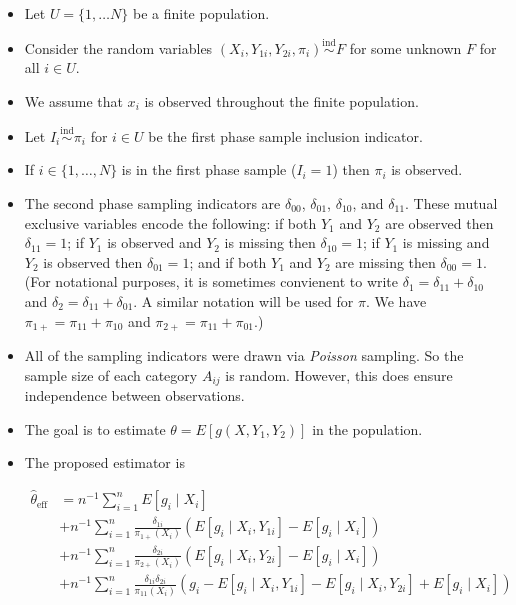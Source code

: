 \documentclass[12pt]{article}
\begin{document}
\begin{itemize}
  \item Let $U = \{1, \dots N\}$ be a finite population.
  \item Consider the random variables $(X_i, Y_{1i}, Y_{2i}, \pi_i) 
    \stackrel{\text{ind}}{\sim} F$ for some unknown $F$ for all $i \in U$.
  \item We assume that $x_i$ is observed throughout the finite population.
  \item Let $I_i \stackrel{\text{ind}}{\sim} \pi_i$ for $i \in U$ be the 
    first phase sample inclusion indicator.
  \item If $i \in \{1, \dots, N\}$ is in the first phase sample ($I_i = 1$)
    then $\pi_i$ is observed. 
  \item The second phase sampling indicators are $\delta_{00}$, $\delta_{01}$,
    $\delta_{10}$, and $\delta_{11}$. These mutual exclusive variables encode 
    the following: if both $Y_1$ and $Y_2$ are observed then $\delta_{11} = 1$;
    if $Y_1$ is observed and $Y_2$ is missing then $\delta_{10} = 1$; if $Y_1$
    is missing and $Y_2$ is observed then $\delta_{01} = 1$; and if both $Y_1$
    and $Y_2$ are missing then $\delta_{00} = 1$. (For notational purposes, it
    is sometimes convienent to write $\delta_{1} = \delta_{11} + \delta_{10}$ 
    and $\delta_2 = \delta_{11} + \delta_{01}$. A similar notation will be 
    used for $\pi$. We have $\pi_{1+} = \pi_{11} + \pi_{10}$ and 
    $\pi_{2+} = \pi_{11} + \pi_{01}$.)
  \item All of the sampling indicators were drawn via \textit{Poisson}
    sampling. So the sample size of each category $A_{ij}$ is random. However,
    this does ensure independence between observations.
  \item The goal is to estimate $\theta = E[g(X, Y_1, Y_2)]$ in the population.
  \item The proposed estimator is

  \begin{align}\label{eq:prop}
    \hat \theta_{\text{eff}} 
    &= n^{-1} \sum_{i = 1}^n E[g_i \mid X_i] \nonumber \\ 
    &+ n^{-1} \sum_{i = 1}^n \frac{\delta_{1i}}{\pi_{1+}(X_i)}
      (E[g_i \mid X_i, Y_{1i}] - E[g_i \mid X_i])\nonumber  \\ 
    &+ n^{-1} \sum_{i = 1}^n \frac{\delta_{2i}}{\pi_{2+}(X_i)}
      (E[g_i \mid X_i, Y_{2i}] - E[g_i \mid X_i])\nonumber  \\ 
    &+ n^{-1} \sum_{i = 1}^n \frac{\delta_{1i} \delta_{2i}}{\pi_{11}(X_i)}
      (g_i - E[g_i \mid X_i, Y_{1i}] - E[g_i \mid X_i, Y_{2i}] + E[g_i \mid X_i])
  \end{align}
  

\end{itemize}
\end{document}
